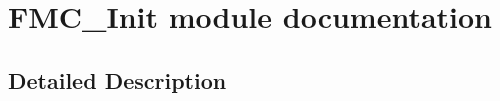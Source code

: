 \hypertarget{group___f_m_c___init__module}{}\section{F\+M\+C\+\_\+\+Init module documentation}
\label{group___f_m_c___init__module}


\subsection{Detailed Description}
